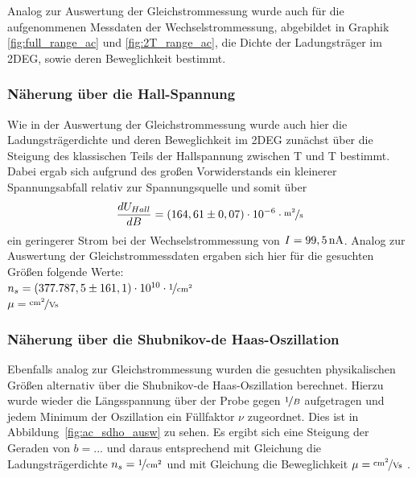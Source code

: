 

Analog zur Auswertung der Gleichstrommessung wurde auch für die aufgenommenen Messdaten der Wechselstrommessung, abgebildet in Graphik \ref{fig:full_range_ac} und \ref{fig:2T_range_ac}, die Dichte der Ladungsträger im 2DEG, sowie deren Beweglichkeit bestimmt.

\subsubsection{Näherung über die Hall-Spannung}
\label{ch:naeherung_hall2}

Wie in der Auswertung der Gleichstrommessung wurde auch hier die Ladungsträgerdichte und deren Beweglichkeit im 2DEG zunächst über die Steigung des klassischen Teils der Hallspannung zwischen \unit[-2]{T} und \unit[2]{T} bestimmt. Dabei ergab sich aufgrund des großen Vorwiderstands ein kleinerer Spannungsabfall relativ zur Spannungsquelle und somit über
\begin{equation}
	\d{U_{Hall}}{B} = ( 164,61 \pm 0,07 ) \cdot 10^{-6} \cdot \unitfrac{m^2}{s}
\end{equation}
ein geringerer Strom bei der Wechselstrommessung von $I=\unit[99,5]{nA}$. Analog zur Auswertung der Gleichstrommessdaten ergaben sich hier für die gesuchten Größen folgende Werte: \\
$n_s=  ( 377.787,5 \pm 161,1) \cdot 10^{10} \cdot \unitfrac{1}{cm^2}$\\
$\mu= \unitfrac{cm^2}{Vs}$  %


\subsubsection{Näherung über die Shubnikov-de Haas-Oszillation}
\label{ch:naeherung_ac}

Ebenfalls analog zur Gleichstrommessung wurden die gesuchten physikalischen Größen alternativ über die Shubnikov-de Haas-Oszillation berechnet. Hierzu wurde wieder die Längsspannung über der Probe 
gegen $\nicefrac{1}{B}$ aufgetragen und jedem Minimum der Oszillation ein Füllfaktor $\nu$ zugeordnet. Dies ist in Abbildung~\ref{fig:ac_sdho_ausw} zu sehen. 
Es ergibt sich eine Steigung der Geraden von $b=...$  %
und daraus entsprechend mit Gleichung %
die Ladungsträgerdichte $n_s= \unitfrac{1}{cm^2}$  %
und mit Gleichung %
die Beweglichkeit          
$\mu= \unitfrac{cm^2}{Vs}$ . %




